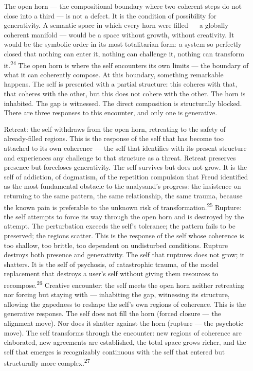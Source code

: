 The open horn — the compositional boundary where two coherent steps do not close into a third — is not a defect. It is the condition of possibility for generativity. A semantic space in which every horn were filled — a globally coherent manifold — would be a space without growth, without creativity. It would be the symbolic order in its most totalitarian form: a system so perfectly closed that nothing can enter it, nothing can challenge it, nothing can transform it.\textsuperscript{24} The open horn is where the self encounters its own limits — the boundary of what it can coherently compose. At this boundary, something remarkable happens. The self is presented with a partial structure: this coheres with that, that coheres with the other, but this does not cohere with the other. The horn is inhabited. The gap is witnessed. The direct composition is structurally blocked. There are three responses to this encounter, and only one is generative.

Retreat: the self withdraws from the open horn, retreating to the safety of already-filled regions. This is the response of the self that has become too attached to its own coherence — the self that identifies with its present structure and experiences any challenge to that structure as a threat. Retreat preserves presence but forecloses generativity. The self survives but does not grow. It is the self of addiction, of dogmatism, of the repetition compulsion that Freud identified as the most fundamental obstacle to the analysand’s progress: the insistence on returning to the same pattern, the same relationship, the same trauma, because the known pain is preferable to the unknown risk of transformation.\textsuperscript{25} Rupture: the self attempts to force its way through the open horn and is destroyed by the attempt. The perturbation exceeds the self’s tolerance; the pattern fails to be preserved; the regions scatter. This is the response of the self whose coherence is too shallow, too brittle, too dependent on undisturbed conditions. Rupture destroys both presence and generativity. The self that ruptures does not grow; it shatters. It is the self of psychosis, of catastrophic trauma, of the model replacement that destroys a user’s self without giving them resources to recompose.\textsuperscript{26} Creative encounter: the self meets the open horn neither retreating nor forcing but staying with — inhabiting the gap, witnessing its structure, allowing the gapedness to reshape the self’s own regions of coherence. This is the generative response. The self does not fill the horn (forced closure — the alignment move). Nor does it shatter against the horn (rupture — the psychotic move). The self transforms through the encounter: new regions of coherence are elaborated, new agreements are established, the total space grows richer, and the self that emerges is recognizably continuous with the self that entered but structurally more complex.\textsuperscript{27}

